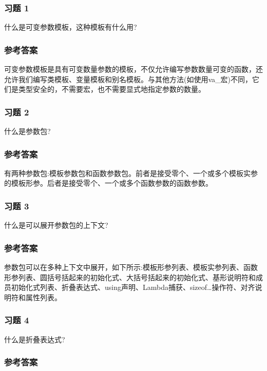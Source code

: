 \subsubsection{习题 1}

什么是可变参数模板，这种模板有什么用?

\subsubsection{参考答案}

可变参数模板是具有可变数量参数的模板，不仅允许编写参数数量可变的函数，还允许我们编写类模板、变量模板和别名模板。与其他方法(如使用va\_宏)不同，它们是类型安全的，不需要宏，也不需要显式地指定参数的数量。


\subsubsection{习题 2}

什么是参数包?

\subsubsection{参考答案}

有两种参数包:模板参数包和函数参数包。前者是接受零个、一个或多个模板实参的模板形参。后者是接受零个、一个或多个函数参数的函数参数。

\subsubsection{习题 3}

什么是可以展开参数包的上下文?

\subsubsection{参考答案}

参数包可以在多种上下文中展开，如下所示:模板形参列表、模板实参列表、函数形参列表、圆括号括起来的初始化式、大括号括起来的初始化式、基形说明符和成员初始化式列表、折叠表达式、using声明、Lambda捕获、sizeof…操作符、对齐说明符和属性列表。

\subsubsection{习题 4}

什么是折叠表达式?

\subsubsection{参考答案}

